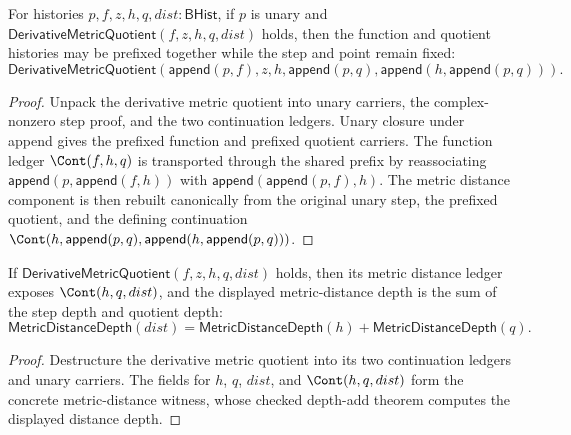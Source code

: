 \begin{theorem}
\label{thm:derivative-metric-quotient-function-prefix-closed}
For histories $p,f,z,h,q,dist:\mathsf{BHist}$, if $p$ is unary and
$\mathsf{DerivativeMetricQuotient}(f,z,h,q,dist)$ holds, then the function
and quotient histories may be prefixed together while the step and point
remain fixed:
$$
\mathsf{DerivativeMetricQuotient}
(\mathsf{append}(p,f),z,h,\mathsf{append}(p,q),
\mathsf{append}(h,\mathsf{append}(p,q))).
$$
\end{theorem}
\begin{proof}
Unpack the derivative metric quotient into unary carriers, the complex-nonzero
step proof, and the two continuation ledgers. Unary closure under append gives
the prefixed function and prefixed quotient carriers. The function ledger
$\Cont(f,h,q)$ is transported through the shared prefix by reassociating
$\mathsf{append}(p,\mathsf{append}(f,h))$ with
$\mathsf{append}(\mathsf{append}(p,f),h)$. The metric distance component is
then rebuilt canonically from the original unary step, the prefixed quotient,
and the defining continuation
$\Cont(h,\mathsf{append}(p,q),\mathsf{append}(h,\mathsf{append}(p,q)))$.
\end{proof}

\begin{theorem}
\label{thm:derivative-metric-quotient-distance-cont-depth-add}
If $\mathsf{DerivativeMetricQuotient}(f,z,h,q,dist)$ holds, then its metric
distance ledger exposes $\Cont(h,q,dist)$, and the displayed metric-distance
depth is the sum of the step depth and quotient depth:
$$
\mathsf{MetricDistanceDepth}(dist)
=
\mathsf{MetricDistanceDepth}(h)+\mathsf{MetricDistanceDepth}(q).
$$
\end{theorem}
\begin{proof}
Destructure the derivative metric quotient into its two continuation ledgers
and unary carriers. The fields for $h$, $q$, $dist$, and $\Cont(h,q,dist)$
form the concrete metric-distance witness, whose checked depth-add theorem
computes the displayed distance depth.
\end{proof}


